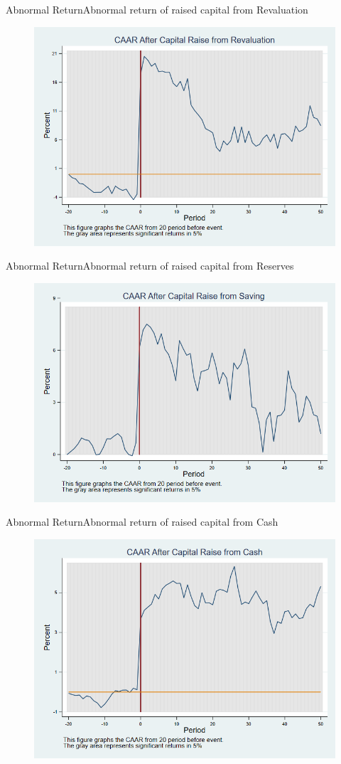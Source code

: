 \documentclass{beamer}
\begin{document}
\begin{frame}{Abnormal Return}{Abnormal return of raised capital from Revaluation}
	\label{car_industryRevaluation}
	\begin{figure}
		\centering
		\includegraphics[width=0.65\linewidth]{Output/car_industryRevaluation.png}
		\label{fig:car_industryRevaluation}
	\end{figure}
\end{frame}


\begin{frame}{Abnormal Return}{Abnormal return of raised capital from Reserves}
	\label{car_industrySaving}
	\begin{figure}
		\centering
		\includegraphics[width=0.65\linewidth]{Output/car_industrySaving.png}
		\label{fig:car_industrySaving}
	\end{figure}
\end{frame}


\begin{frame}{Abnormal Return}{Abnormal return of raised capital from Cash}
	\label{car_industryCash}
	\begin{figure}
		\centering
		\includegraphics[width=0.65\linewidth]{Output/car_industryCash.png}
		\label{fig:car_industryCash}
	\end{figure}
	
\end{frame}
\end{document}

